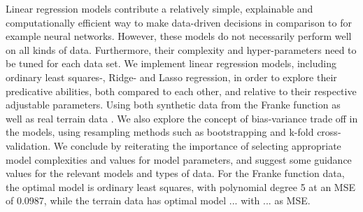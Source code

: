 Linear regression models contribute a relatively simple, explainable and computationally efficient way to make data-driven decisions in comparison to for example neural networks.
However, these models do not necessarily perform well on all kinds of data.
Furthermore, their complexity and hyper-parameters need to be tuned for each data set.
We implement linear regression models, including ordinary least squares-, Ridge- and Lasso regression, in order to explore their predicative abilities, both compared to each other, and relative to their respective adjustable parameters. 
Using both synthetic data from the Franke function \citep[p. 13]{frank} as well as real terrain data \cite{mortengithub}.
We also explore the concept of bias-variance trade off in the models, using resampling methods such as bootstrapping and k-fold cross-validation. 
We conclude by reiterating the importance of selecting appropriate model complexities and values for model parameters, and suggest some guidance values for the relevant models and types of data. 
For the Franke function data, the optimal model is ordinary least squares, with polynomial degree 5 at an MSE of 0.0987, while the terrain data has optimal model ... with ... as MSE.
